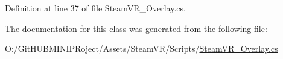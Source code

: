 Definition at line 37 of file Steam\+V\+R\+\_\+\+Overlay.\+cs.



The documentation for this class was generated from the following file\+:\begin{DoxyCompactItemize}
\item 
O\+:/\+Git\+H\+U\+B\+M\+I\+N\+I\+P\+Roject/\+Assets/\+Steam\+V\+R/\+Scripts/\mbox{\hyperlink{_steam_v_r___overlay_8cs}{Steam\+V\+R\+\_\+\+Overlay.\+cs}}\end{DoxyCompactItemize}
